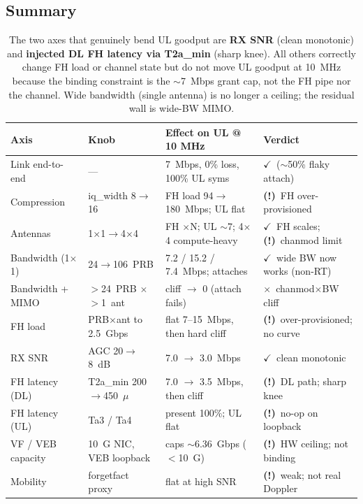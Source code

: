 \documentclass[11pt,a4paper]{article}
\newcommand{\yes}{\textcolor{closedcol}{\ensuremath{\checkmark}}}
\newcommand{\warn}{\textcolor{orange!85!black}{\textbf{(!)}}}
\newcommand{\no}{\textcolor{opencol}{\ensuremath{\times}}}
\newcommand{\us}{\ensuremath{\mu}\text{s}}
\begin{document}
\subsection{Summary}

\begin{table}[h]\centering\small
\begin{tabularx}{\linewidth}{@{}l l X l@{}}
\toprule
\textbf{Axis} & \textbf{Knob} & \textbf{Effect on UL @ 10 MHz} & \textbf{Verdict} \\
\midrule
Link end-to-end & --- & 7~Mbps, 0\% loss, 100\% UL syms & \yes\ ($\sim$50\% flaky attach) \\
Compression & iq\_width 8$\rightarrow$16 & FH load 94$\rightarrow$180~Mbps; UL flat & \warn\ FH over-provisioned \\
Antennas & 1$\times$1$\rightarrow$4$\times$4 & FH $\times$N; UL $\sim$7; 4$\times$4 compute-heavy & \yes\ FH scales; \warn\ chanmod limit \\
Bandwidth (1$\times$1) & 24$\rightarrow$106~PRB & 7.2 / 15.2 / 7.4~Mbps; attaches & \yes\ wide BW now works (non-RT) \\
Bandwidth + MIMO & $>$24~PRB $\times$$>$1~ant & cliff $\rightarrow$ 0 (attach fails) & \no\ chanmod$\times$BW cliff \\
FH load & PRB$\times$ant to 2.5~Gbps & flat 7--15~Mbps, then hard cliff & \warn\ over-provisioned; no curve \\
RX SNR & AGC 20$\rightarrow$8~dB & 7.0 $\rightarrow$ 3.0~Mbps & \yes\ clean monotonic \\
FH latency (DL) & T2a\_min 200$\rightarrow$450~\us & 7.0 $\rightarrow$ 3.5~Mbps, then cliff & \warn\ DL path; sharp knee \\
FH latency (UL) & Ta3 / Ta4 & present 100\%; UL flat & \warn\ no-op on loopback \\
VF / VEB capacity & 10~G NIC, VEB loopback & caps $\sim$6.36~Gbps ($<$10~G) & \warn\ HW ceiling; not binding \\
Mobility & forgetfact proxy & flat at high SNR & \warn\ weak; not real Doppler \\
\bottomrule
\end{tabularx}
\caption*{\small The two axes that genuinely bend UL goodput are \textbf{RX SNR} (clean
monotonic) and \textbf{injected DL FH latency via T2a\_min} (sharp knee). All others
correctly change FH load or channel state but do not move UL goodput at 10~MHz because the
binding constraint is the $\sim$7~Mbps grant cap, not the FH pipe nor the channel. Wide
bandwidth (single antenna) is no longer a ceiling; the residual wall is wide-BW MIMO.}
\end{table}
\end{document}
